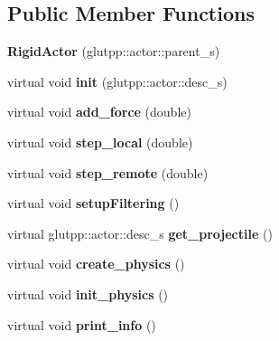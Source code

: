 \subsection*{\-Public \-Member \-Functions}
\begin{DoxyCompactItemize}
\item 
\hypertarget{classneb_1_1Actor_1_1RigidActor_ac4ff1c2a8d278a0150b78eb8f0926242}{{\bfseries \-Rigid\-Actor} (glutpp\-::actor\-::parent\-\_\-s)}\label{classneb_1_1Actor_1_1RigidActor_ac4ff1c2a8d278a0150b78eb8f0926242}

\item 
\hypertarget{classneb_1_1Actor_1_1RigidActor_a14c131b0620a383c1bac6f31903bd2c6}{virtual void {\bfseries init} (glutpp\-::actor\-::desc\-\_\-s)}\label{classneb_1_1Actor_1_1RigidActor_a14c131b0620a383c1bac6f31903bd2c6}

\item 
\hypertarget{classneb_1_1Actor_1_1RigidActor_aa46996a108d191eaa0c05beabe8ba015}{virtual void {\bfseries add\-\_\-force} (double)}\label{classneb_1_1Actor_1_1RigidActor_aa46996a108d191eaa0c05beabe8ba015}

\item 
\hypertarget{classneb_1_1Actor_1_1RigidActor_ab387292054623de9ec9c5de26ad84d71}{virtual void {\bfseries step\-\_\-local} (double)}\label{classneb_1_1Actor_1_1RigidActor_ab387292054623de9ec9c5de26ad84d71}

\item 
\hypertarget{classneb_1_1Actor_1_1RigidActor_ab72bf9a60632e398f601b0f1adbf811e}{virtual void {\bfseries step\-\_\-remote} (double)}\label{classneb_1_1Actor_1_1RigidActor_ab72bf9a60632e398f601b0f1adbf811e}

\item 
\hypertarget{classneb_1_1Actor_1_1RigidActor_a0c859ee3609c13faf5f626b9aa6f67ab}{virtual void {\bfseries setup\-Filtering} ()}\label{classneb_1_1Actor_1_1RigidActor_a0c859ee3609c13faf5f626b9aa6f67ab}

\item 
\hypertarget{classneb_1_1Actor_1_1RigidActor_affb958ff8ac655c25906b0a9cd0f0bb5}{virtual glutpp\-::actor\-::desc\-\_\-s {\bfseries get\-\_\-projectile} ()}\label{classneb_1_1Actor_1_1RigidActor_affb958ff8ac655c25906b0a9cd0f0bb5}

\item 
\hypertarget{classneb_1_1Actor_1_1RigidActor_ae43181ba4f6b5b3fb782f6a689ec5dc5}{virtual void {\bfseries create\-\_\-physics} ()}\label{classneb_1_1Actor_1_1RigidActor_ae43181ba4f6b5b3fb782f6a689ec5dc5}

\item 
\hypertarget{classneb_1_1Actor_1_1RigidActor_a558079bb45a9986bfbfcb92c2d8e005a}{virtual void {\bfseries init\-\_\-physics} ()}\label{classneb_1_1Actor_1_1RigidActor_a558079bb45a9986bfbfcb92c2d8e005a}

\item 
\hypertarget{classneb_1_1Actor_1_1RigidActor_a8dd99df00071772dfd5227226105a16e}{virtual void {\bfseries print\-\_\-info} ()}\label{classneb_1_1Actor_1_1RigidActor_a8dd99df00071772dfd5227226105a16e}

\end{DoxyCompactItemize}


